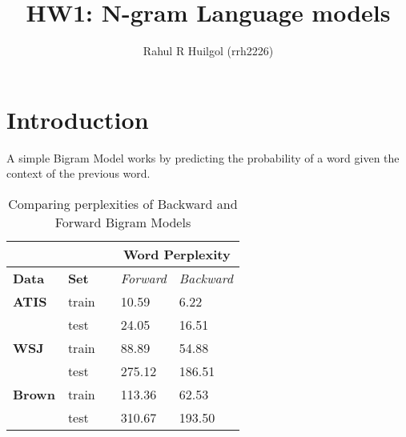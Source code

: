 \documentclass{article}
\begin{document}
\title{HW1: N-gram Language models}
\author{Rahul R Huilgol (rrh2226)}
\maketitle

\section{Introduction}
A simple Bigram Model works by predicting the probability of a word given the context of the previous word. 
\begin{table}[h]
\centering
\begin{tabular}{@{}lllll@{}}
\toprule
\textbf{}      & \textbf{}    &  & \multicolumn{2}{c}{\textbf{Word Perplexity}} \\ \midrule
\textbf{Data}  & \textbf{Set} &  & \textit{Forward}     & \textit{Backward}     \\ \midrule
\textbf{ATIS}  & train        &  & 10.59               & 6.22               \\ \midrule
               & test         &  & 24.05               & 16.51                \\ \midrule
\textbf{WSJ}   & train        &  & 88.89               & 54.88                \\ \midrule
               & test         &  & 275.12               & 186.51               \\ \midrule
\textbf{Brown} & train        &  & 113.36              & 62.53                \\ \midrule
               & test         &  & 310.67              & 193.50               \\ \bottomrule
\end{tabular}
\caption{Comparing perplexities of Backward and Forward Bigram Models}
\label{backvforw}
\end{table}
\end{document}
